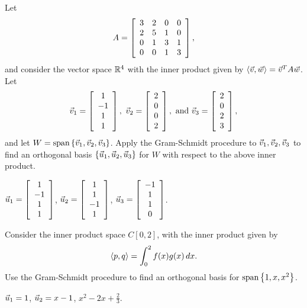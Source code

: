 \documentclass{ximera}
\begin{document}
\begin{exercise}
  Let
  \begin{equation*}
    A = \startmat{cccc}
      3 & 2 & 0 & 0 \\
      2 & 5 & 1 & 0 \\
      0 & 1 & 3 & 1 \\
      0 & 0 & 1 & 3 \\
    \stopmat,
  \end{equation*}
  and consider the vector space $\R^4$ with the inner product given by
  $\iprod{\vect{v},\vect{w}} = \vect{v}^T A\vect{w}$.
  Let
  \begin{equation*}
    \vect{v}_1 = \startmat{c} 1 \\ -1 \\ 1 \\ 1 \stopmat,
    \quad
    \vect{v}_2 = \startmat{c} 2 \\ 0 \\ 0 \\ 2 \stopmat,
    \quad\mbox{and}\quad
    \vect{v}_3 = \startmat{c} 2 \\ 0 \\ 2 \\ 3 \stopmat,
  \end{equation*}
  and let $W=\sspan\set{\vect{v}_1,\vect{v}_2,\vect{v}_3}$.  Apply the
  Gram-Schmidt procedure to $\vect{v}_1,\vect{v}_2,\vect{v}_3$ to find
  an orthogonal basis $\set{\vect{u}_1,\vect{u}_2,\vect{u}_3}$ for $W$
  with respect to the above inner product.
  \begin{solution}
    $\vect{u}_1 = \startmat{c} 1 \\ -1 \\ 1 \\ 1 \stopmat$,
    $\vect{u}_2 = \startmat{c} 1 \\ 1 \\ -1 \\ 1 \stopmat$,
    $\vect{u}_3 = \startmat{c} -1 \\ 1 \\ 1 \\ 0 \stopmat$.
  \end{solution}
\end{exercise}

\begin{exercise}
  Consider the inner product space $C[0,2]$, with the inner product
  given by
  \begin{equation*}
    \iprod{p,q} = \int_{0}^{2} f(x)g(x)\,dx.
  \end{equation*}
  Use the Gram-Schmidt procedure to find an orthogonal basis for
  $\sspan\set{1,x,x^2}$.
  \begin{solution}
    $\vect{u}_1 = 1$, $\vect{u}_2 = x-1$, $x^2 - 2x + \frac{2}{3}$.
  \end{solution}
\end{exercise}
\end{document}
